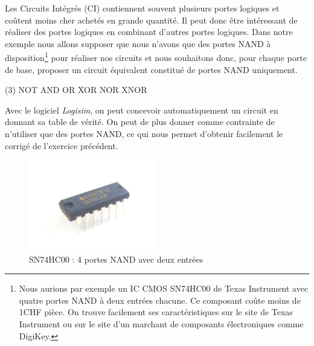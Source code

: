 \documentclass[a4paper,11pt]{book}
\theoremstyle{definition}
\begin{document}
\begin{exercise}
    Les Circuits Intégrés (CI) contiennent souvent plusieurs portes logiques et coûtent moins cher achetés en grande quantité. Il peut donc être intéressant de réaliser des portes logiques en combinant d'autres portes logiques.
    Dans notre exemple nous allons supposer que nous n'avons que des portes NAND à disposition\footnote{Nous aurions par exemple un IC CMOS SN74HC00 de Texas Instrument avec quatre portes NAND à deux entrées chacune. Ce composant coûte moins de 1CHF pièce. On trouve facilement ses caractéristiques sur le site de Texas Instrument ou sur le site d'un marchant de composants électroniques comme DigiKey.} pour réaliser nos circuits et nous souhaitons donc, pour chaque porte de base, proposer un circuit équivalent constitué de portes NAND uniquement.
    \begin{tasks}(3)
        \task NOT
        \task AND
        \task OR
        \task XOR
        \task NOR
        \task XNOR
    \end{tasks}
\end{exercise}

\begin{exercise}
Avec le logiciel \emph{Logisim}, on peut concevoir automatiquement un circuit en donnant sa table de vérité. On peut de plus donner comme contrainte de n'utiliser que des portes NAND, ce qui nous permet d'obtenir facilement le corrigé de l'exercice précédent.
\end{exercise}

\begin{figure}[H]
\centering
\includegraphics[width=0.5\textwidth]{media/ImplementationGates/SN74HC00-2-Input-NAND-Gate.jpeg}
\caption{SN74HC00 : 4 portes NAND avec deux entrées}
\label{fig:SN74}
\end{figure}

\nocite{fonctionlogique}

%
\end{document}
